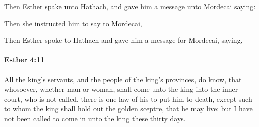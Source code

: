 			\begin{versebox}
					\item[BHS] 
					\item[LXX] 
					\item[ASV] Then Esther spake unto Hathach, and gave him a message unto Mordecai saying:
					\item[NIV] Then she instructed him to say to Mordecai,
					\item[NRSV] Then Esther spoke to Hathach and gave him a message for Mordecai, saying,
			\end{versebox}

		\paragraph{Esther 4:11} %
			\label{ESTHER-4-11}

			All the king’s servants, and the people of the king’s provinces, do know, that whosoever, whether man or woman, shall come unto the king into the inner court, who is not called, there is one law of his to put him to death, except such to whom the king shall hold out the golden sceptre, that he may live: but I have not been called to come in unto the king these thirty days.


